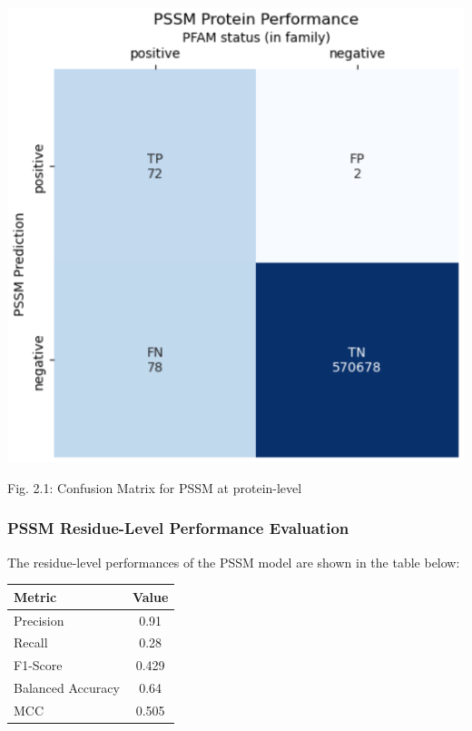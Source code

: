 \documentclass[10pt,twocolumn,letterpaper]{article}
\begin{document}
\begin{center}
    \includegraphics[scale=0.45]{report/img/pssm_prot_performance.png}
\end{center}

\begin{center}
    \small{Fig. 2.1: Confusion Matrix for PSSM at protein-level}
\end{center}

\subsubsection{PSSM Residue-Level Performance Evaluation}

The residue-level performances of the PSSM model are shown in the table below:


\begin{center}
    \begin{tabular}{lc}
        \toprule
        Metric & Value \\
        \midrule
        Precision & 0.91 \\
        Recall & 0.28 \\
        F1-Score & 0.429 \\
        Balanced Accuracy & 0.64 \\
        MCC & 0.505 \\
        \bottomrule
    \end{tabular}
\end{center} \\
\end{document}
